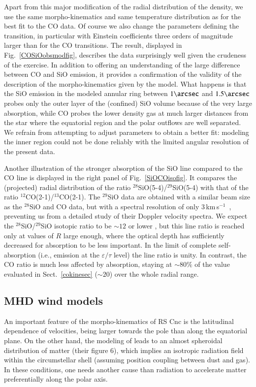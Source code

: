 \documentclass{aa}
\newcommand{\kms}{\,km\,s$^{-1}$~}
\begin{document}
Apart from this major modification of the radial distribution of the
density, we use the same morpho-kinematics and same temperature
distribution as for the best fit to the CO data. Of course we also
change the parameters defining the transition, in particular with
Einstein coefficients three orders of magnitude larger than for the CO
transitions. The result, displayed in Fig.~\ref{COSiOobsmodfig},
describes the data surprisingly well given the crudeness of the
exercise. In addition to offering an understanding of the large
difference between CO and SiO emission, it provides a confirmation of
the validity of the description of the morpho-kinematics given by the
model. What happens is that the SiO emission in the modeled annular
ring between $1\arcsec$ and $1.5\arcsec$ probes only the outer layer
of the (confined) SiO volume because of the very large absorption,
while CO probes the lower density gas at much larger distances from
the star where the equatorial region and the polar outflows are well
separated. We refrain from attempting to adjust parameters to obtain a
better fit: modeling the inner region could not be done reliably with
the limited angular resolution of the present data.

Another illustration of the stronger absorption of the SiO line
compared to the CO line is displayed in the right panel of
Fig.~\ref{SiOCOisofig}. It compares the (projected) radial
distribution of the ratio $^{28}$SiO(5-4)/$^{29}$SiO(5-4) with that of
the ratio $^{12}$CO(2-1)/$^{13}$CO(2-1). The $^{29}$SiO data are
obtained with a similar beam size as the $^{28}$SiO and CO data, but
with a spectral resolution of only 3\kms, preventing us from a
detailed study  of their Doppler velocity spectra. We expect the
$^{28}$SiO/$^{29}$SiO isotopic ratio to be $\sim 12$ or lower
\citep{do2018,do2020}, but this line ratio is reached only at values
of $R$ large enough, where the optical depth has sufficiently
decreased for absorption to be less important. In the limit of
complete self-absorption (i.e., emission at the $\varepsilon/\tau$
level) the line ratio is unity. In contrast, the CO ratio is much less
affected by absorption, staying at $\sim 80\%$ of the value evaluated
in Sect.~\ref{cokinesec} ($\sim 20$) over the whole radial range.

\subsection{MHD wind models}\label{mhdmodelsec}

An important feature of the morpho-kinematics of RS Cnc is the
latitudinal dependence of velocities, being larger towards the pole
than along the equatorial plane. On the other hand, the modeling of
\citet{hmwng14} leads to an almost spheroidal distribution of matter
(their figure 6), which implies an isotropic radiation field within
the circumstellar shell (assuming position coupling between dust and
gas). In these conditions, one needs another cause than radiation to
accelerate matter preferentially along the polar axis.
\end{document}
